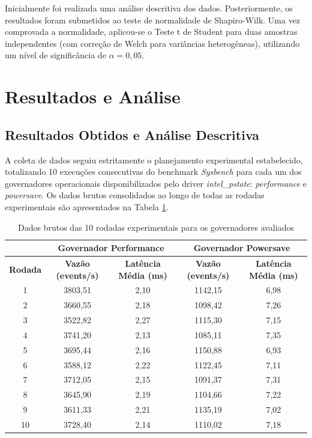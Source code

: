 \documentclass[12pt]{article}
\begin{document}
Inicialmente foi realizada uma análise descritiva dos dados. Posteriormente, os resultados foram submetidos ao teste de normalidade de Shapiro-Wilk. Uma vez comprovada a normalidade, aplicou-se o Teste t de Student para duas amostras independentes (com correção de Welch para variâncias heterogêneas), utilizando um nível de significância de $\alpha = 0,05$.


\section{Resultados e Análise}

\subsection{Resultados Obtidos e Análise Descritiva}

A coleta de dados seguiu estritamente o planejamento experimental estabelecido, totalizando 10 execuções consecutivas do benchmark \textit{Sysbench} para cada um dos governadores operacionais disponibilizados pelo driver \textit{intel\_pstate}: \textit{performance} e \textit{powersave}. Os dados brutos consolidados ao longo de todas as rodadas experimentais são apresentados na Tabela \ref{tab:resultados_brutos}.

\begin{table}[ht]
\centering
\caption{Dados brutos das 10 rodadas experimentais para os governadores avaliados}
\label{tab:resultados_brutos}
\begin{tabular}{|c|c|c|c|c|}
\hline
\textbf{} & \multicolumn{2}{c|}{\textbf{Governador Performance}} & \multicolumn{2}{c|}{\textbf{Governador Powersave}} \\ \hline
\textbf{Rodada} & \textbf{Vazão (events/s)} & \textbf{Latência Média (ms)} & \textbf{Vazão (events/s)} & \textbf{Latência Média (ms)} \\ \hline
1  & 3803,51 & 2,10 & 1142,15 & 6,98 \\ \hline
2  & 3660,55 & 2,18 & 1098,42 & 7,26 \\ \hline
3  & 3522,82 & 2,27 & 1115,30 & 7,15 \\ \hline
4  & 3741,20 & 2,13 & 1085,11 & 7,35 \\ \hline
5  & 3695,44 & 2,16 & 1150,88 & 6,93 \\ \hline
6  & 3588,12 & 2,22 & 1122,45 & 7,11 \\ \hline
7  & 3712,05 & 2,15 & 1091,37 & 7,31 \\ \hline
8  & 3645,90 & 2,19 & 1104,66 & 7,22 \\ \hline
9  & 3611,33 & 2,21 & 1135,19 & 7,02 \\ \hline
10 & 3728,40 & 2,14 & 1110,02 & 7,18 \\ \hline
\end{tabular}
\end{table}
\end{document}
